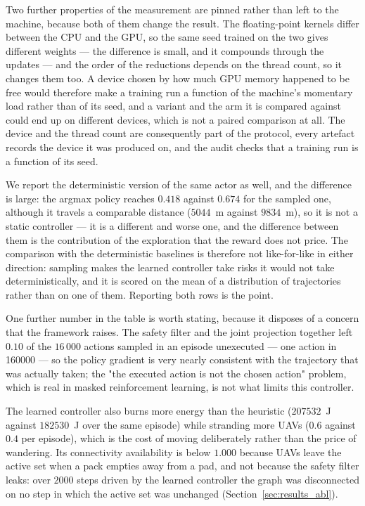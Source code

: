 Two further properties of the measurement are pinned rather than left to
the machine, because both of them change the result.  The floating-point
kernels differ between the CPU and the GPU, so the same seed trained on
the two gives different weights --- the difference is small, and it
compounds through the updates --- and the order of the reductions depends
on the thread count, so it changes them too.  A device chosen by how much
GPU memory happened to be free would therefore make a training run a
function of the machine's momentary load rather than of its seed, and a
variant and the arm it is compared against could end up on different
devices, which is not a paired comparison at all.  The device and the
thread count are consequently part of the protocol, every artefact records
the device it was produced on, and the audit checks that a training run is
a function of its seed.

We report the
deterministic version of the same actor as
well, and the difference is large: the argmax policy reaches $0.418$
against $0.674$ for the sampled one, although it travels a comparable
distance ($5044$~m against $9834$~m), so it is
not a static controller --- it is a different and worse one, and the
difference between them is the contribution of the exploration that the
reward does not price.  The comparison with the deterministic baselines is
therefore not like-for-like in either direction: sampling makes the learned
controller take risks it would not take deterministically, and it is scored
on the mean of a distribution of trajectories rather than on one of them.
Reporting both rows is the point.

One further number in the table is worth stating, because it disposes of a
concern that the framework raises.  The safety filter and the joint
projection together left $0.10$ of the $16\,000$
actions sampled in an episode unexecuted --- one action in 160000 --- so the
policy gradient is very nearly
consistent with the trajectory that was actually taken; the
"the executed action is not the chosen action" problem, which is real in
masked reinforcement learning, is not what limits this controller.

The learned controller also burns more energy than the heuristic
($207532$~J against $182530$~J over the same episode) while
stranding more UAVs ($0.6$ against $0.4$ per
episode), which is the cost of moving deliberately rather than the price of
wandering.  Its connectivity availability is
below $1.000$ because UAVs leave the active set when a pack empties away
from a pad, and not because the safety filter leaks: over $2000$
steps driven by the learned controller the graph was disconnected on no step in
which the active set was unchanged (Section~\ref{sec:results_abl}).

